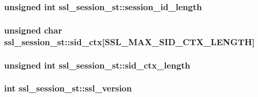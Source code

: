 \subsubsection[{\texorpdfstring{session\+\_\+id\+\_\+length}{session_id_length}}]{\setlength{\rightskip}{0pt plus 5cm}unsigned int ssl\+\_\+session\+\_\+st\+::session\+\_\+id\+\_\+length}\hypertarget{structssl__session__st_a593371acd210b99ad600853361b807ce}{}\label{structssl__session__st_a593371acd210b99ad600853361b807ce}
\subsubsection[{\texorpdfstring{sid\+\_\+ctx}{sid_ctx}}]{\setlength{\rightskip}{0pt plus 5cm}unsigned char ssl\+\_\+session\+\_\+st\+::sid\+\_\+ctx\mbox{[}{\bf S\+S\+L\+\_\+\+M\+A\+X\+\_\+\+S\+I\+D\+\_\+\+C\+T\+X\+\_\+\+L\+E\+N\+G\+TH}\mbox{]}}\hypertarget{structssl__session__st_ad465f7554a5e14d6c92ee563d5ed6fe1}{}\label{structssl__session__st_ad465f7554a5e14d6c92ee563d5ed6fe1}
\subsubsection[{\texorpdfstring{sid\+\_\+ctx\+\_\+length}{sid_ctx_length}}]{\setlength{\rightskip}{0pt plus 5cm}unsigned int ssl\+\_\+session\+\_\+st\+::sid\+\_\+ctx\+\_\+length}\hypertarget{structssl__session__st_a22ec3aac135c2b8268e0ea69c66fc829}{}\label{structssl__session__st_a22ec3aac135c2b8268e0ea69c66fc829}
\subsubsection[{\texorpdfstring{ssl\+\_\+version}{ssl_version}}]{\setlength{\rightskip}{0pt plus 5cm}int ssl\+\_\+session\+\_\+st\+::ssl\+\_\+version}\hypertarget{structssl__session__st_a551e39a73ea78af29979d80d8a6db6f9}{}\label{structssl__session__st_a551e39a73ea78af29979d80d8a6db6f9}

